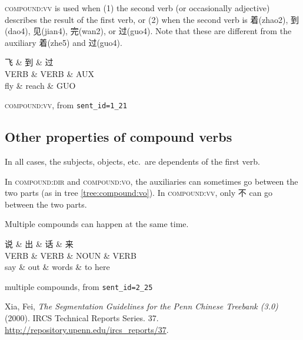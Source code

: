 \documentclass[UTF8,oneside]{book}
\begin{document}
\textsc{compound:vv} is used when (1) the second verb (or occasionally adjective) describes the result of the first verb, or (2) when the second verb is 着(zhao2), 到(dao4), 见(jian4), 完(wan2), or 过(guo4). Note that these are different from the auxiliary 着(zhe5) and 过(guo4). 

\begin{tree}[h]
\centering
\begin{dependency}[theme=simple]
\begin{deptext}[column sep=.5cm, row sep=.5ex]
飞 \& 到 \& 过 \\
VERB \& VERB \& AUX \\
fly \& reach \& GUO \\
\end{deptext}
\end{dependency}
\caption{\textsc{compound:vv}, from \texttt{sent\_id=1\_21}}
\end{tree}

\subsection{Other properties of compound verbs}

In all cases, the subjects, objects, etc.\ are dependents of the first verb. 

In \textsc{compound:dir} and \textsc{compound:vo}, the auxiliaries can sometimes go between the two parts (as in tree \ref{tree:compound:vo}). In \textsc{compound:vv}, only 不 can go between the two parts. 

Multiple compounds can happen at the same time. 

\begin{tree}[h]
\centering
\begin{dependency}[theme=simple]
\begin{deptext}[column sep=.5cm, row sep=.5ex]
说 \& 出 \& 话 \& 来  \\
VERB \& VERB \& NOUN \& VERB  \\
say \& out \& words \& to here \\
\end{deptext}
\end{dependency}
\caption{multiple compounds, from \texttt{sent\_id=2\_25}}
\end{tree}

\begin{thebibliography}{9}
Xia, Fei, \emph{The Segmentation Guidelines for the Penn Chinese Treebank (3.0)} (2000). IRCS Technical Reports Series. 37.
\url{http://repository.upenn.edu/ircs_reports/37}.
\end{thebibliography}

\printindex
\end{document}
